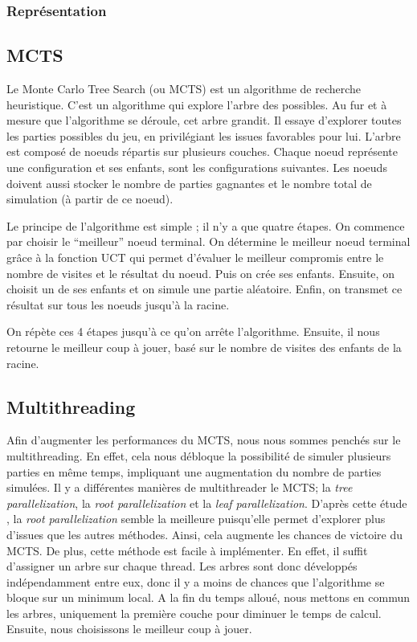 \documentclass[a4paper,11pt]{article}
\begin{document}
\hypertarget{repruxe9sentation}{%
\subsubsection{Représentation}\label{repruxe9sentation}}

\hypertarget{mcts}{%
\subsection{MCTS}\label{mcts}}

Le Monte Carlo Tree Search (ou MCTS) est un algorithme de recherche
heuristique. C'est un algorithme qui explore l'arbre des possibles. Au
fur et à mesure que l'algorithme se déroule, cet arbre grandit. Il
essaye d'explorer toutes les parties possibles du jeu, en privilégiant
les issues favorables pour lui. L'arbre est composé de noeuds répartis
sur plusieurs couches. Chaque noeud représente une configuration et ses
enfants, sont les configurations suivantes. Les noeuds doivent aussi
stocker le nombre de parties gagnantes et le nombre total de simulation
(à partir de ce noeud).

Le principe de l'algorithme est simple ; il n'y a que quatre étapes. On
commence par choisir le ``meilleur'' noeud terminal. On détermine le
meilleur noeud terminal grâce à la fonction UCT qui permet d'évaluer le
meilleur compromis entre le nombre de visites et le résultat du noeud.
Puis on crée ses enfants. Ensuite, on choisit un de ses enfants et on
simule une partie aléatoire. Enfin, on transmet ce résultat sur tous les
noeuds jusqu'à la racine.

On répète ces 4 étapes jusqu'à ce qu'on arrête l'algorithme. Ensuite, il
nous retourne le meilleur coup à jouer, basé sur le nombre de visites
des enfants de la racine.

\hypertarget{multithreading}{%
\subsection{Multithreading}\label{multithreading}}

Afin d'augmenter les performances du MCTS, nous nous sommes penchés sur
le multithreading. En effet, cela nous débloque la possibilité de
simuler plusieurs parties en même temps, impliquant une augmentation du
nombre de parties simulées. Il y a différentes manières de multithreader
le MCTS; la \emph{tree parallelization}, la \emph{root parallelization}
et la \emph{leaf parallelization}. D'après cette étude
\citep{mass_par_mcts} \citep{par_mcts}, la \emph{root parallelization}
semble la meilleure puisqu'elle permet d'explorer plus d'issues que les
autres méthodes. Ainsi, cela augmente les chances de victoire du MCTS.
De plus, cette méthode est facile à implémenter. En effet, il suffit
d'assigner un arbre sur chaque thread. Les arbres sont donc développés
indépendamment entre eux, donc il y a moins de chances que l'algorithme
se bloque sur un minimum local. A la fin du temps alloué, nous mettons
en commun les arbres, uniquement la première couche pour diminuer le
temps de calcul. Ensuite, nous choisissons le meilleur coup à jouer.
\end{document}
